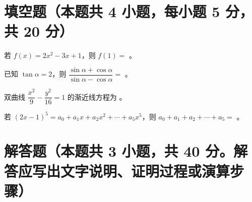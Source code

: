 \documentclass{exam-zh}
\begin{document}
\section{填空题（本题共 4 小题，每小题 5 分，共 20 分）}

\begin{question}
  若 $f(x) = 2x^2 - 3x + 1$，则 $f(1) = $ \fillin[0]。
\end{question}

\begin{question}
  已知 $\tan \alpha = 2$，则 $\dfrac{\sin \alpha + \cos \alpha}{\sin \alpha - \cos \alpha} = $ \fillin[3]。
\end{question}

\begin{question}
  双曲线 $\dfrac{x^2}{9} - \dfrac{y^2}{16} = 1$ 的渐近线方程为 \fillin[{$y = \pm \frac{4}{3}x$}]。
\end{question}

\begin{question}
  若 $(2x - 1)^5 = a_0 + a_1 x + a_2 x^2 + \cdots + a_5 x^5$，则 $a_0 + a_1 + a_2 + \cdots + a_5 = $ \fillin[1]。
\end{question}


\section{解答题（本题共 3 小题，共 40 分。解答应写出文字说明、证明过程或演算步骤）}
\end{document}
